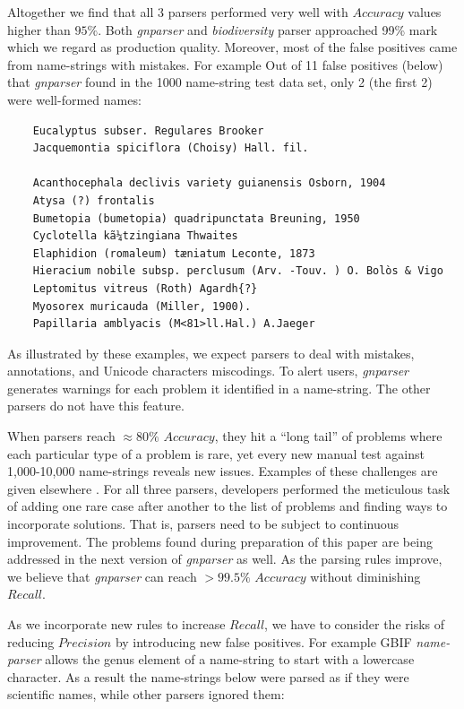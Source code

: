 \documentclass{bmcart}
\begin{document}
Altogether we find that all 3 parsers performed very well with $Accuracy$
values higher than $95\%$. Both \textit{gnparser} and \textit{biodiversity}
parser approached 99\% mark which we regard as production quality. Moreover,
most of the false positives came from name-strings with mistakes. For example
Out of 11 false positives (below) that \textit{gnparser} found in the 1000
name-string test data set, only 2 (the first 2) were well-formed names:

\vspace{0.5cm}

\begin{verbatim}
    Eucalyptus subser. Regulares Brooker
    Jacquemontia spiciflora (Choisy) Hall. fil.

    Acanthocephala declivis variety guianensis Osborn, 1904
    Atysa (?) frontalis
    Bumetopia (bumetopia) quadripunctata Breuning, 1950
    Cyclotella kã¼tzingiana Thwaites
    Elaphidion (romaleum) tæniatum Leconte, 1873
    Hieracium nobile subsp. perclusum (Arv. -Touv. ) O. Bolòs & Vigo
    Leptomitus vitreus (Roth) Agardh{?}
    Myosorex muricauda (Miller, 1900).
    Papillaria amblyacis (M<81>ll.Hal.) A.Jaeger
\end{verbatim}

\vspace{0.5cm}

As illustrated by these examples, we expect parsers to deal with
mistakes, annotations, and Unicode characters miscodings. To alert users,
\textit{gnparser} generates warnings for each problem it identified in a name-string. The other parsers do not have this feature.

When parsers reach $\approx80\%$ $Accuracy$, they hit a ``long tail'' of
problems where each particular type of a problem is rare, yet every new manual
test against 1,000-10,000 name-strings reveals new issues.  Examples of these
challenges are given elsewhere \cite{Patterson:inpress-a}. For all three
parsers, developers performed the meticulous task of adding one rare case after
another to the list of problems and finding ways to incorporate solutions. That
is, parsers need to be subject to continuous improvement. The problems found
during preparation of this paper are being addressed in the next version of
\textit{gnparser} as well. As the parsing rules improve, we believe that
\textit{gnparser} can reach $>99.5\%$ $Accuracy$ without diminishing $Recall$.

As we incorporate new rules to increase $Recall$, we have to consider the risks
of reducing $Precision$ by introducing new false positives. For example GBIF
\textit{name-parser} allows the genus element of a name-string to start with a
lowercase character. As a result the name-strings below were parsed as if they
were scientific names, while other parsers ignored them:
\end{document}
